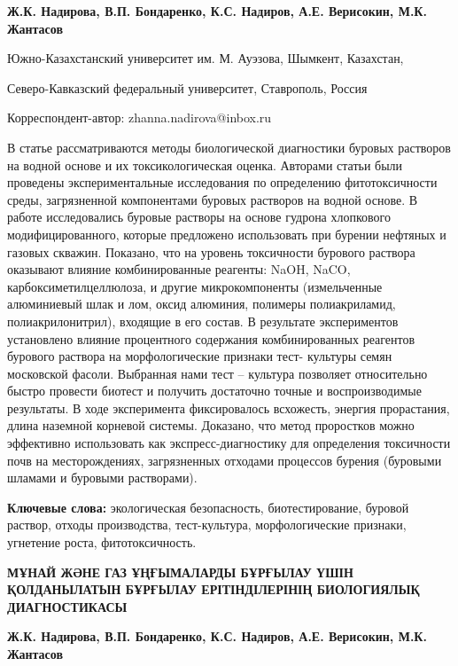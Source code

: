 
\begin{header}

{\bfseries
{}Ж.К. Надирова\envelope,
В.П. Бондаренко,
К.С. Надиров,
А.Е. Верисокин,
М.К. Жантасов
}
\end{header}

\begin{affil}
Южно-Казахстанский университет им. М. Ауэзова, Шымкент, Казахстан,

Северо-Кавказский федеральный университет, Ставрополь, Россия

\envelope Корреспондент-автор: zhanna.nadirova@inbox.ru
\end{affil}

В статье рассматриваются методы биологической диагностики буровых
растворов на водной основе и их токсикологическая оценка. Авторами
статьи были проведены экспериментальные исследования по определению
фитотоксичности среды, загрязненной компонентами буровых растворов на
водной основе. В работе исследовались буровые растворы на основе гудрона
хлопкового модифицированного, которые предложено использовать при
бурении нефтяных и газовых скважин. Показано, что на уровень токсичности
бурового раствора оказывают влияние комбинированные реагенты: NaOH,
NaCO, карбоксиметилцеллюлоза, и другие
микрокомпоненты (измельченные алюминиевый шлак и лом, оксид алюминия,
полимеры полиакриламид, полиакрилонитрил), входящие в его состав. В
результате экспериментов установлено влияние процентного содержания
комбинированных реагентов бурового раствора на морфологические признаки
тест- культуры семян московской фасоли. Выбранная нами тест -- культура
позволяет относительно быстро провести биотест и получить достаточно
точные и воспроизводимые результаты. В ходе эксперимента фиксировалось
всхожесть, энергия прорастания, длина наземной корневой системы.
Доказано, что метод проростков можно эффективно использовать как
экспресс-диагностику для определения токсичности почв на месторождениях,
загрязненных отходами процессов бурения (буровыми шламами и буровыми
растворами).

{\bfseries Ключевые слова:} экологическая безопасность, биотестирование,
буровой раствор, отходы производства, тест-культура, морфологические
признаки, угнетение роста, фитотоксичность.

\begin{header}
{\bfseries МҰНАЙ ЖӘНЕ ГАЗ ҰҢҒЫМАЛАРДЫ БҰРҒЫЛАУ ҮШІН ҚОЛДАНЫЛАТЫН БҰРҒЫЛАУ ЕРІТІНДІЛЕРІНІҢ БИОЛОГИЯЛЫҚ ДИАГНОСТИКАСЫ}

{\bfseries
{}Ж.К. Надирова\envelope,
В.П. Бондаренко,
К.С. Надиров,
А.Е. Верисокин,
М.К. Жантасов
}
\end{header}

